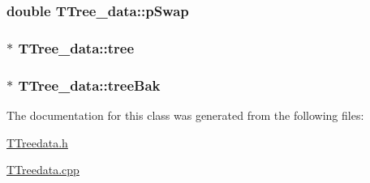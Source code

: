 \subsubsection[{p\+Swap}]{\setlength{\rightskip}{0pt plus 5cm}double T\+Tree\+\_\+data\+::p\+Swap\hspace{0.3cm}{\ttfamily [private]}}\label{classTTree__data_a14ad1213b452c13d7385fbf6f74e1fcf}
\hypertarget{classTTree__data_adb6a018eb7424a0205ff478287dffab5}{}
\subsubsection[{tree}]{$\ast$ T\+Tree\+\_\+data\+::tree\hspace{0.3cm}{\ttfamily [private]}}\label{classTTree__data_adb6a018eb7424a0205ff478287dffab5}
\hypertarget{classTTree__data_a26a88706b642cb77cb2f7e152ffe16c3}{}
\subsubsection[{tree\+Bak}]{ $\ast$ T\+Tree\+\_\+data\+::tree\+Bak\hspace{0.3cm}{\ttfamily [private]}}\label{classTTree__data_a26a88706b642cb77cb2f7e152ffe16c3}


The documentation for this class was generated from the following files\+:\begin{DoxyCompactItemize}
\item 
\hyperlink{TTreedata_8h}{T\+Treedata.\+h}\item 
\hyperlink{TTreedata_8cpp}{T\+Treedata.\+cpp}\end{DoxyCompactItemize}
